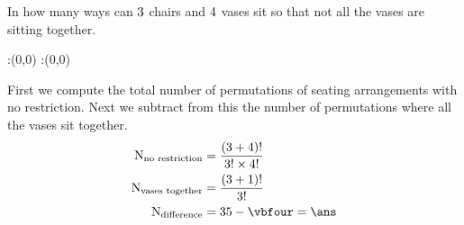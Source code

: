 



\gcalcexpr[0]{\ans}{\vbthree-\vbfour}
\question[3] In how many ways can $3$ chairs and $4$ vases sit so that
not all the vases are sitting together.


\watchout

\ifprintanswers
  \begin{marginfigure}
      :(0,0)
      :(0,0)
    \figdrawbegin{}
      \figdrawline [100,101]
    \figdrawend
    \figvisu{\figBoxA}{}{%
    }
    \centerline{\box\figBoxA}
  \end{marginfigure}
\fi 

\begin{solution}[\mcq]
  First we compute the total number of permutations of seating arrangements
  with no restriction. Next we subtract from this the number of permutations 
  where all the vases sit together. 
  \begin{align}
        \text{N}_{\text{no restriction}} 
            &= \dfrac{(\vbone+\vbtwo)!}{\vbone!\times\vbtwo!} \\
  	\text{N}_{\text{vases together}} 
            &= \dfrac{(\vbone+1)!}{\vbone!} \\ 
        \text{N}_{\text{difference}}     
            &= \vbthree - \vbfour = \ans 
  \end{align}
\end{solution}
